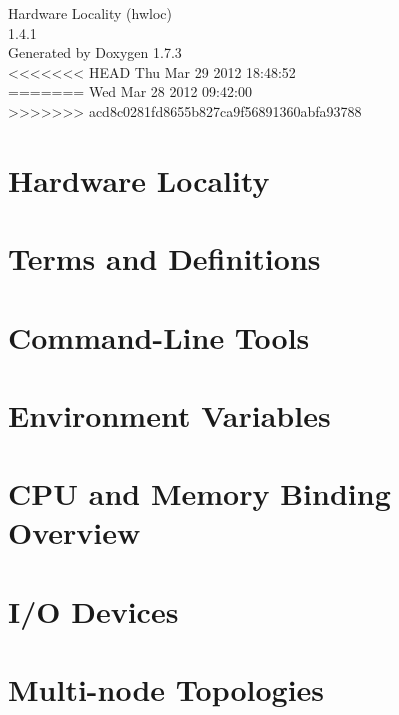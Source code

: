 \documentclass[letterpaper]{book}
\begin{document}
\hypersetup{pageanchor=false}
\begin{titlepage}
\vspace*{7cm}
\begin{center}
{\Large Hardware Locality (hwloc) \\[1ex]\large 1.4.1 }\\
\vspace*{1cm}
{\large Generated by Doxygen 1.7.3}\\
\vspace*{0.5cm}
<<<<<<< HEAD
{\small Thu Mar 29 2012 18:48:52}\\
=======
{\small Wed Mar 28 2012 09:42:00}\\
>>>>>>> acd8c0281fd8655b827ca9f56891360abfa93788
\end{center}
\end{titlepage}
\clearemptydoublepage
{}
\tableofcontents
\clearemptydoublepage
{}
\hypersetup{pageanchor=true}
\chapter{Hardware Locality}
\label{index}\hypertarget{index}{}
\chapter{Terms and Definitions}
\label{termsanddefs}
\hypertarget{termsanddefs}{}

\chapter{Command-\/Line Tools}
\label{tools}
\hypertarget{tools}{}

\chapter{Environment Variables}
\label{envvar}
\hypertarget{envvar}{}

\chapter{CPU and Memory Binding Overview}
\label{cpu_mem_bind}
\hypertarget{cpu_mem_bind}{}

\chapter{I/O Devices}
\label{iodevices}
\hypertarget{iodevices}{}

\chapter{Multi-\/node Topologies}
\label{multinode}
\hypertarget{multinode}{}

\end{document}
